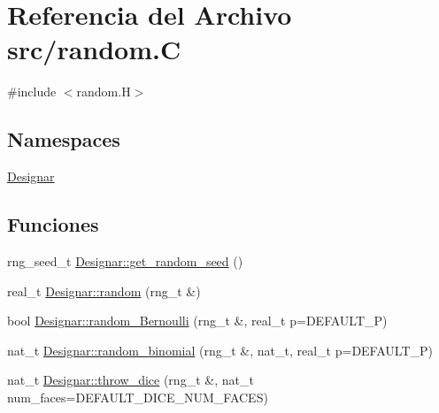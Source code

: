 \hypertarget{random_8_c}{}\section{Referencia del Archivo src/random.C}
\label{random_8_c}
{\ttfamily \#include $<$random.\+H$>$}\newline
\subsection*{Namespaces}
\begin{DoxyCompactItemize}
\item 
 \hyperlink{namespace_designar}{Designar}
\end{DoxyCompactItemize}
\subsection*{Funciones}
\begin{DoxyCompactItemize}
\item 
rng\+\_\+seed\+\_\+t \hyperlink{namespace_designar_a39f540907bf568cf8e9983cffbc5246c}{Designar\+::get\+\_\+random\+\_\+seed} ()
\item 
real\+\_\+t \hyperlink{namespace_designar_ae380ee144e16364a26bec38110ac58cc}{Designar\+::random} (rng\+\_\+t \&)
\item 
bool \hyperlink{namespace_designar_adf6febbe5fa0abe44ea554203b767685}{Designar\+::random\+\_\+\+Bernoulli} (rng\+\_\+t \&, real\+\_\+t p=D\+E\+F\+A\+U\+L\+T\+\_\+P)
\item 
nat\+\_\+t \hyperlink{namespace_designar_a4f786bd2e0e15f81f468cf60b3a1d9fb}{Designar\+::random\+\_\+binomial} (rng\+\_\+t \&, nat\+\_\+t, real\+\_\+t p=D\+E\+F\+A\+U\+L\+T\+\_\+P)
\item 
nat\+\_\+t \hyperlink{namespace_designar_a29b53c8e7dfb33209e0a79ad167b6803}{Designar\+::throw\+\_\+dice} (rng\+\_\+t \&, nat\+\_\+t num\+\_\+faces=D\+E\+F\+A\+U\+L\+T\+\_\+\+D\+I\+C\+E\+\_\+\+N\+U\+M\+\_\+\+F\+A\+C\+ES)
\end{DoxyCompactItemize}
